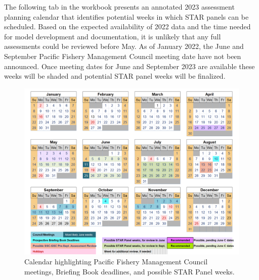\documentclass[11pt,
  english,
  a4paper,
]{article}
\begin{document}
\leavevmode\tagmcend\tagstructend


The following tab in the workbook presents an annotated 2023 assessment planning calendar that identifies potential weeks in which STAR panels can be scheduled. Based on the expected availability of 2022 data and the time needed for model development and documentation, it is unlikely that any full assessments could be reviewed before May. As of January 2022, the June and September Pacific Fishery Management Council meeting date have not been announced. Once meeting dates for June and September 2023 are available these weeks will be shaded and potential STAR panel weeks will be finalized.

\leavevmode\tagmcend\tagstructend\par


\begin{figure}
\centering
\includegraphics[width=1\textwidth,height=1\textheight]{figs/calendar.png}
\caption{Calendar highlighting Pacific Fishery Management Council meetings, Briefing Book deadlines, and possible STAR Panel weeks.\label{fig:calendar}}
\end{figure}

\tagmcend\tagstructend
\end{document}
